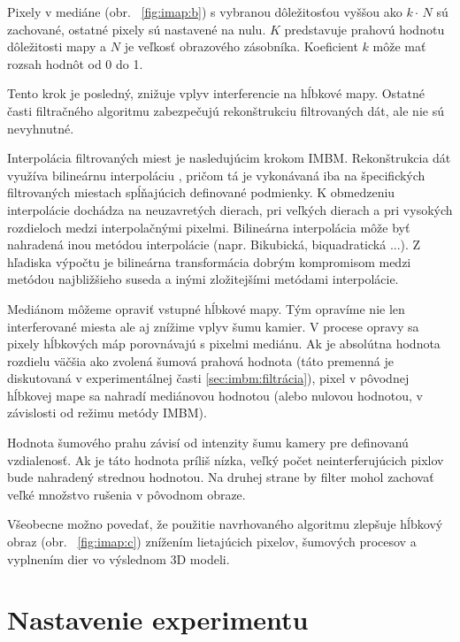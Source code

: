 Pixely v mediáne (obr. \, \ref{fig:imap:b}) s vybranou dôležitosťou vyššou ako $ k \cdot \, N $ sú zachované, ostatné pixely sú nastavené na nulu. $K$ predstavuje prahovú hodnotu dôležitosti mapy a $N$ je veľkosť obrazového zásobníka. Koeficient $k$ môže mať rozsah hodnôt od 0 do 1. 

Tento krok je posledný, znižuje vplyv interferencie na hĺbkové mapy. Ostatné časti filtračného algoritmu zabezpečujú rekonštrukciu filtrovaných dát, ale nie sú nevyhnutné. 

Interpolácia filtrovaných miest je nasledujúcim krokom IMBM. Rekonštrukcia dát využíva bilineárnu interpoláciu \cite{Volak2019}, pričom tá je vykonávaná iba na špecifických filtrovaných miestach spĺňajúcich definované podmienky. K obmedzeniu interpolácie dochádza na neuzavretých dierach, pri veľkých dierach a pri vysokých rozdieloch medzi interpolačnými pixelmi. Bilineárna interpolácia môže byť nahradená inou metódou interpolácie (napr. Bikubická, biquadratická ...). Z hľadiska výpočtu je bilineárna transformácia dobrým kompromisom medzi metódou najbližšieho suseda a inými zložitejšími metódami interpolácie.

Mediánom môžeme opraviť vstupné hĺbkové mapy. Tým opravíme nie len interferované miesta ale aj znížime vplyv šumu kamier. V procese opravy sa pixely hĺbkových máp porovnávajú s pixelmi mediánu. Ak je absolútna hodnota rozdielu väčšia ako zvolená šumová prahová hodnota (táto premenná je diskutovaná v experimentálnej časti \ref{sec:imbm:filtrácia}), pixel v pôvodnej hĺbkovej mape sa nahradí mediánovou hodnotou (alebo nulovou hodnotou, v závislosti od režimu metódy IMBM).

Hodnota šumového prahu závisí od intenzity šumu kamery pre definovanú vzdialenosť. Ak je táto hodnota príliš nízka, veľký počet neinterferujúcich pixlov bude nahradený strednou hodnotou. Na druhej strane by filter mohol zachovať veľké množstvo rušenia v pôvodnom obraze.

Všeobecne možno povedať, že použitie navrhovaného algoritmu zlepšuje hĺbkový obraz (obr. \, \ref{fig:imap:c}) znížením lietajúcich pixelov, šumových procesov a vyplnením dier vo výslednom 3D modeli.


\section{Nastavenie experimentu}

